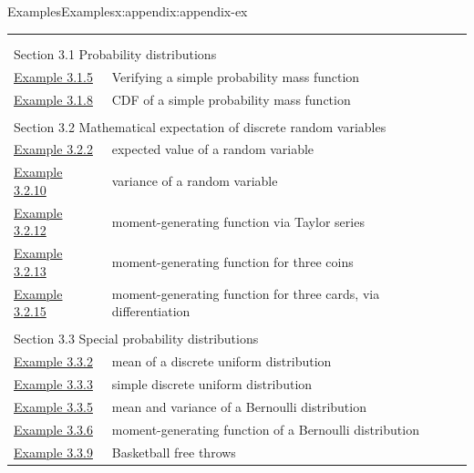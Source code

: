 \documentclass[oneside,10pt,]{book}
\numberwithin{equation}{section}
\begin{document}
\begin{appendixptx}{Examples}{}{Examples}{}{}{x:appendix:appendix-ex}
\noindent
\begin{longtable}[l]{ll}
\addtocounter{table}{-1}
\endfirsthead
\endhead
\multicolumn{2}{r}{(Continued on next page)}\\
\endfoot
\endlastfoot
\multicolumn{2}{l}{\null}\\[1.5ex] \multicolumn{2}{l}{\large Section 3.1 Probability distributions}\\[0.5ex]
\hyperref[x:example:ex-disc-pmf]{Example 3.1.5}& Verifying a simple probability mass function\\
\hyperref[x:example:ex-disc-pmf-to-cdf]{Example 3.1.8}& CDF of a simple probability mass function\\
\multicolumn{2}{l}{\null}\\[1.5ex] \multicolumn{2}{l}{\large Section 3.2 Mathematical expectation of discrete random variables}\\[0.5ex]
\hyperref[x:example:ex-disc-pmf-mean]{Example 3.2.2}& expected value of a random variable\\
\hyperref[x:example:ex-disc-pmf-variance]{Example 3.2.10}& variance of a random variable\\
\hyperref[x:example:ex-maclaurin]{Example 3.2.12}& moment-generating function via Taylor series\\
\hyperref[x:example:ex-three-coins-mgf]{Example 3.2.13}& moment-generating function for three coins\\
\hyperref[x:example:ex-three-coins-mgf2]{Example 3.2.15}& moment-generating function for three cards, via differentiation\\
\multicolumn{2}{l}{\null}\\[1.5ex] \multicolumn{2}{l}{\large Section 3.3 Special probability distributions}\\[0.5ex]
\hyperref[x:example:ex-disc-unif-mean]{Example 3.3.2}& mean of a discrete uniform distribution\\
\hyperref[x:example:ex-disc-unif-simple]{Example 3.3.3}& simple discrete uniform distribution\\
\hyperref[x:example:ex-bern-mean-var]{Example 3.3.5}& mean and variance of a Bernoulli distribution\\
\hyperref[x:example:ex-bern-mgf]{Example 3.3.6}& moment-generating function of a Bernoulli distribution\\
\hyperref[x:example:ex-bin-basketball-dumb]{Example 3.3.9}& Basketball free throws\\

\end{longtable}
\end{appendixptx}
\end{document}
